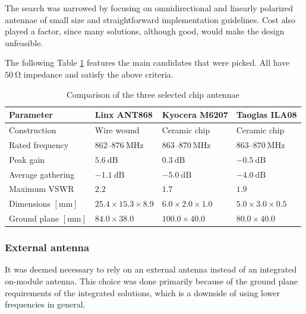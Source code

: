 The search was narrowed by focusing on omnidirectional and linearly polarized antennae of small size and straightforward implementation guidelines. Cost also played a factor, since many solutions, although good, would make the design unfeasible.

The following Table \ref{table:antenna-chip} features the main candidates that were picked. All have $50~\mathrm{\Omega}$ impedance and satisfy the above criteria.

\begin{table}[H]
\begin{center}
\caption{\label{table:antenna-chip}Comparison of the three selected chip antennae}
    \begin{tabular}{|l|l|l|l|} \hline
    \textbf{Parameter} & \textbf{Linx ANT868}\cite{linx_technologies_he_2024} & \textbf{Kyocera M6207}\cite{kyocera_ism_2024} & \textbf{Taoglas ILA08}\cite{taoglas_ila08_nodate} \\ \hline
    Construction & Wire wound & Ceramic chip & Ceramic chip \\ \hline
    Rated frequency                 & $862 \text{--} 876~\mathrm{MHz}$ & $863 \text{--} 870~\mathrm{MHz}$ & $863 \text{--} 870~\mathrm{MHz}$ \\ \hline
    Peak gain                       & $5.6~\mathrm{dB}$     & $0.3~\mathrm{dB}$     & $-0.5~\mathrm{dB}$ \\ \hline
    Average gathering               & $-1.1~\mathrm{dB}$    & $-5.0~\mathrm{dB}$    & $-4.0~\mathrm{dB}$ \\ \hline
    Maximum VSWR                    & $2.2$                 & $1.7$                 & $1.9$ \\ \hline
    Dimensions $\mathrm{[mm]}$      & $25.4 \times 15.3 \times 8.9$ & $6.0 \times 2.0 \times 1.0$ & $5.0 \times 3.0 \times 0.5$ \\ \hline
    Ground plane $\mathrm{[mm]}$    & $84.0 \times 38.0$ & $100.0 \times 40.0$ & $80.0 \times 40.0$ \\ \hline
    \end{tabular}
\end{center}
\end{table}

\subsubsection{External antenna}
It was deemed necessary to rely on an external antenna instead of an integrated on-module antenna. This choice was done primarily because of the ground plane requirements of the integrated solutions, which is a downside of using lower frequencies in general.

